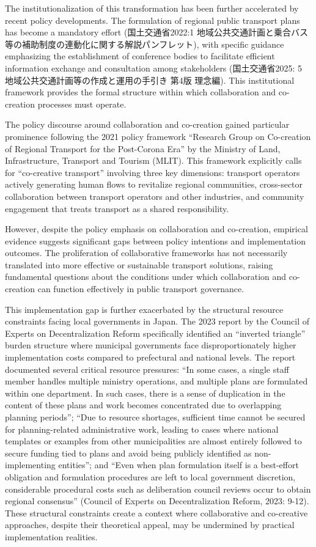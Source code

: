 The institutionalization of this transformation has been further
accelerated by recent policy developments. The formulation of regional
public transport plans has become a mandatory effort (国土交通省2022:1
地域公共交通計画と乗合バス等の補助制度の連動化に関する解説パンフレット),
with specific guidance emphasizing the establishment of conference
bodies to facilitate efficient information exchange and consultation
among stakeholders (国土交通省2025: 5
地域公共交通計画等の作成と運用の手引き 第4版 理念編). This institutional
framework provides the formal structure within which collaboration and
co-creation processes must operate.

The policy discourse around collaboration and co-creation gained
particular prominence following the 2021 policy framework ``Research
Group on Co-creation of Regional Transport for the Post-Corona Era'' by
the Ministry of Land, Infrastructure, Transport and Tourism (MLIT). This
framework explicitly calls for ``co-creative transport'' involving three
key dimensions: transport operators actively generating human flows to
revitalize regional communities, cross-sector collaboration between
transport operators and other industries, and community engagement that
treats transport as a shared responsibility.

However, despite the policy emphasis on collaboration and co-creation,
empirical evidence suggests significant gaps between policy intentions
and implementation outcomes. The proliferation of collaborative
frameworks has not necessarily translated into more effective or
sustainable transport solutions, raising fundamental questions about the
conditions under which collaboration and co-creation can function
effectively in public transport governance.

This implementation gap is further exacerbated by the structural
resource constraints facing local governments in Japan. The 2023 report
by the Council of Experts on Decentralization Reform specifically
identified an ``inverted triangle'' burden structure where municipal
governments face disproportionately higher implementation costs compared
to prefectural and national levels. The report documented several
critical resource pressures: ``In some cases, a single staff member
handles multiple ministry operations, and multiple plans are formulated
within one department. In such cases, there is a sense of duplication in
the content of these plans and work becomes concentrated due to
overlapping planning periods''; ``Due to resource shortages, sufficient
time cannot be secured for planning-related administrative work, leading
to cases where national templates or examples from other municipalities
are almost entirely followed to secure funding tied to plans and avoid
being publicly identified as non-implementing entities''; and ``Even
when plan formulation itself is a best-effort obligation and formulation
procedures are left to local government discretion, considerable
procedural costs such as deliberation council reviews occur to obtain
regional consensus'' (Council of Experts on Decentralization Reform,
2023: 9-12). These structural constraints create a context where
collaborative and co-creative approaches, despite their theoretical
appeal, may be undermined by practical implementation realities.

